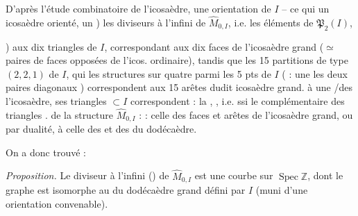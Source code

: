 \documentclass[11pt,a4paper]{article}
\begin{document}
D'après l'étude combinatoire de l'icosaèdre,  une orientation de $I$ -- ce qui  un icosaèdre orienté, \ill{} un ) les  diviseurs à l'infini de $\widehat{M}_{0,I}$, i.e. les éléments de $\mathfrak{P}_2(I)$,  

) aux dix \og triangles\fg{} de $I$, correspondant aux dix faces de l'icosaèdre grand (${\simeq}$ paires de faces opposées de l'icos. ordinaire), tandis que les 15 partitions de type $(2,2,1)$ de $I$, qui \ill{}  \ill{} les structures  sur quatre parmi les 5 pts de $I$
( : une   les deux paires  diagonaux ) correspondent aux 15 arêtes dudit icosaèdre grand.       à une /des \ill{} l'icosaèdre, ses \og triangles\fg{} $\subset I$ correspondent : \ill{}   \ill{} la  \ill{},   , i.e. ssi le complémentaire des triangles  .   \ill{}      de la structure $\widehat{M}_{0,I}$ :  : celle des faces et arêtes de l'icosaèdre grand, ou par dualité, à celle des   et des   du dodécaèdre.

On a donc trouvé :

\emph{Proposition.} Le diviseur à l'infini () de $\widehat{M}_{0,I}$ est une courbe   sur $\operatorname{Spec}\mathbb{Z}$, dont le graphe est isomorphe au   du dodécaèdre grand défini par $I$ (muni d'une orientation convenable).
\end{document}
